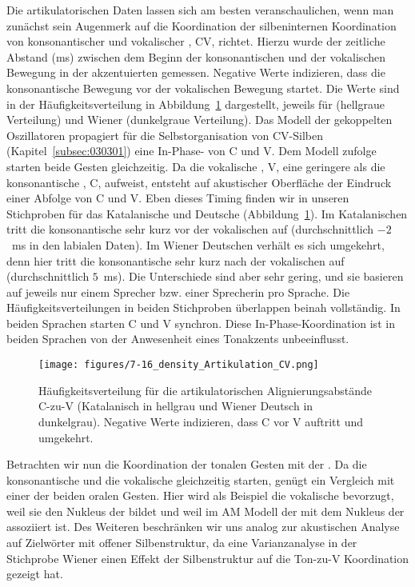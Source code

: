 Die artikulatorischen Daten lassen sich am besten veranschaulichen, wenn man zunächst sein Augenmerk auf die Koordination der silbeninternen Koordination von konsonantischer und vokalischer , CV, richtet. Hierzu wurde der zeitliche Abstand (ms) zwischen dem Beginn der konsonantischen  und der vokalischen Bewegung in der akzentuierten  gemessen. Negative Werte indizieren, dass die konsonantische Bewegung vor der vokalischen Bewegung startet. Die Werte sind in der Häufigkeitsverteilung in Abbildung~\ref{figure:0716} dargestellt, jeweils für  (hellgraue Verteilung) und Wiener  (dunkelgraue Verteilung). Das Modell der gekoppelten Oszillatoren propagiert für die Selbstorganisation von CV-Silben (Kapitel~\ref{subsec:030301}) eine In-Phase- von C und V. Dem Modell zufolge starten beide Gesten gleichzeitig. Da die vokalische , V, eine geringere  als die konsonantische , C, aufweist, entsteht auf akustischer Oberfläche der Eindruck einer Abfolge von C und V. Eben dieses Timing finden wir in unseren Stichproben für das Katalanische und Deutsche (Abbildung~\ref{figure:0716}). Im Katalanischen tritt die konsonantische  sehr kurz vor der vokalischen  auf (durchschnittlich $-2$~ms in den labialen Daten). Im Wiener Deutschen verhält es sich umgekehrt, denn hier tritt die konsonantische  sehr kurz nach der vokalischen auf (durchschnittlich $5$~ms). Die Unterschiede sind aber sehr gering, und sie basieren auf jeweils nur einem Sprecher bzw. einer Sprecherin pro Sprache. Die Häufigkeitsverteilungen in beiden Stichproben überlappen beinah vollständig. In beiden Sprachen starten C und V synchron. Diese In-Phase-Koordination ist in beiden Sprachen von der Anwesenheit eines Tonakzents unbeeinflusst.

\begin{figure}[p]
	\texttt{[image: figures/7-16\_density\_Artikulation\_CV.png]}
	\caption{Häufigkeitsverteilung für die artikulatorischen Alignierungsabstände C-zu-V (Katalanisch in hellgrau und Wiener Deutsch in dunkelgrau). Negative Werte indizieren, dass C vor V auftritt und umgekehrt.}
	\label{figure:0716}
\end{figure}

\largerpage
Betrachten wir nun die Koordination der tonalen Gesten mit der . Da die konsonantische und die vokalische  gleichzeitig starten, genügt ein Vergleich mit einer der beiden oralen Gesten. Hier wird als Beispiel die vokalische  bevorzugt, weil sie den Nukleus der  bildet und weil im AM Modell der  mit dem Nukleus der  assoziiert ist. Des Weiteren beschränken wir uns analog zur akustischen Analyse auf Zielwörter mit offener Silbenstruktur, da eine Varianzanalyse in der Stichprobe Wiener  einen Effekt der Silbenstruktur auf die Ton-zu-V Koordination gezeigt hat.

